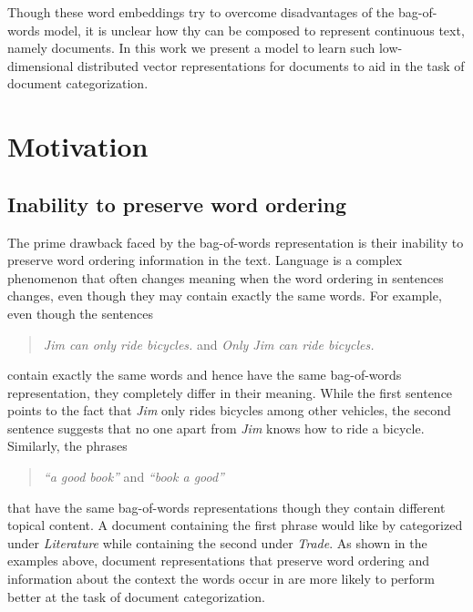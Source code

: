 Though these word embeddings try to overcome disadvantages of the bag-of-words model, it is unclear how thy can be composed to represent continuous text, namely documents. In this work we present a model to learn such low-dimensional distributed vector representations for documents to aid in the task of document categorization.
 
\section{Motivation}

\subsection{Inability to preserve word ordering}
The prime drawback faced by the bag-of-words representation is their inability to preserve word ordering information in the text. Language is a complex phenomenon that often changes meaning when the word ordering in sentences changes, even though they may contain exactly the same words. For example, even though the sentences
\begin{quote}
\centering
\emph{ 	Jim can only ride bicycles. } and \emph{ 	Only Jim can ride bicycles. }
\end{quote}
contain exactly the same words and hence have the same bag-of-words representation, they completely differ in their meaning. While the first sentence points to the fact that \emph{Jim} only rides bicycles among other vehicles, the second sentence suggests that no one apart from \emph{Jim} knows how to ride a bicycle. 
Similarly, the phrases 
\begin{quote}
\centering
\emph{ 	``a good book'' } and \emph{ 	``book a good'' }
\end{quote}
that have the same bag-of-words representations though they contain different topical content. A document containing the first phrase would like by categorized under \emph{Literature} while containing the second under \emph{Trade}.
As shown in the examples above, document representations that preserve word ordering and information about the context the words occur in are more likely to perform better at the task of document categorization.

